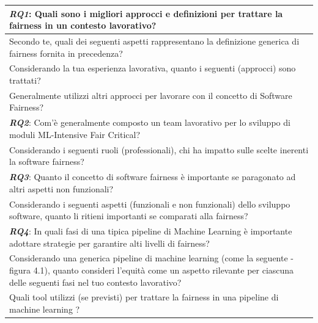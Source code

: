     \begin{longtable}{| p{} |} 
        
        \hline
        \rowcolor{Gray}
        \textbf{\textit{{RQ1}}}:  Quali sono i migliori approcci e definizioni per trattare la fairness in un contesto lavorativo?\\
        
        \hline 
         Secondo te, quali dei seguenti aspetti rappresentano la definizione generica di fairness fornita in precedenza?
         \\ \hline
        Considerando la tua esperienza lavorativa, quanto i seguenti (approcci) sono trattati?
        \\ \hline
        Generalmente utilizzi altri approcci per lavorare con il concetto di Software Fairness?
        \\ \hline
        
        \rowcolor{Gray}
        \textbf{\textit{{RQ2}}}:  Com'è generalmente composto un team lavorativo per lo sviluppo di moduli ML-Intensive Fair Critical?\\
        
        \hline 
         Considerando i seguenti ruoli (professionali), chi ha impatto sulle scelte inerenti la software fairness?
       
        \\ \hline
        \rowcolor{Gray}
        \textbf{\textit{{RQ3}}}:  Quanto il concetto di software fairness è importante se paragonato ad altri aspetti non funzionali?\\
        
        \hline 
         Considerando i seguenti aspetti (funzionali e non funzionali) dello sviluppo software, quanto li ritieni importanti se comparati alla fairness?
         
        \\ \hline
        \rowcolor{Gray}
        \textbf{\textit{{RQ4}}}:  In quali fasi di una tipica pipeline di Machine Learning è importante adottare strategie per garantire alti livelli di fairness?\\
        
        \hline 
         Considerando una generica pipeline di machine learning (come la seguente - figura 4.1), quanto consideri l’equità come un aspetto rilevante per ciascuna delle seguenti fasi nel tuo contesto lavorativo?
         
         \\ \hline
        Quali tool utilizzi (se previsti) per trattare la fairness in una pipeline di machine learning ?
        

\end{longtable}
